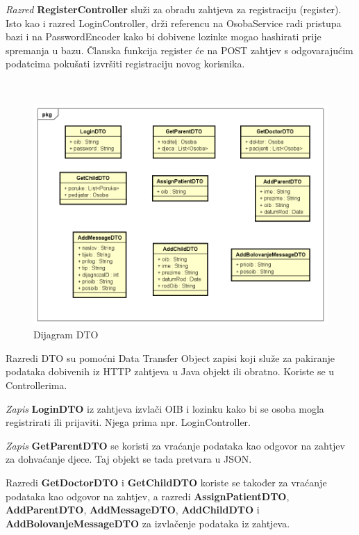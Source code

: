 			\textit{Razred }\textbf{RegisterController}
			 služi za obradu zahtjeva za registraciju (register).
			Isto kao i razred LoginController, drži referencu na OsobaService radi pristupa bazi i na PasswordEncoder
			kako bi dobivene lozinke mogao hashirati prije spremanja u bazu. Članska funkcija register će na POST
			zahtjev s odgovarajućim podatcima pokušati izvršiti registraciju novog korisnika. 
 

		

			\

			\begin{figure}[H]
				\includegraphics[width=\textwidth]{dijagrami/DijagramDTO.PNG} %
				\caption{Dijagram DTO}
				\label{fig:dijagramdto} %
			\end{figure}
			
			Razredi DTO su pomoćni Data Transfer Object zapisi koji služe za pakiranje podataka dobivenih iz HTTP zahtjeva u Java objekt ili obratno. Koriste se u Controllerima. 
			
			\textit{Zapis }\textbf{LoginDTO} iz zahtjeva izvlači OIB i lozinku kako bi se osoba mogla registrirati ili prijaviti. Njega prima npr. LoginController.
			
			\textit{Zapis }\textbf{GetParentDTO} se koristi za vraćanje podataka kao odgovor na zahtjev za dohvaćanje djece. Taj objekt se tada pretvara u JSON.  
			
			Razredi \textbf{GetDoctorDTO} i \textbf{GetChildDTO} koriste se također za vraćanje podataka kao odgovor na zahtjev, a razredi \textbf{AssignPatientDTO}, \textbf{AddParentDTO}, \textbf{AddMessageDTO}, \textbf{AddChildDTO} i \textbf{AddBolovanjeMessageDTO} za izvlačenje podataka iz zahtjeva.
			
